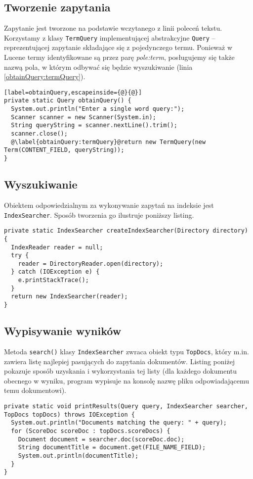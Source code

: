\subsection{Tworzenie zapytania}

Zapytanie jest tworzone na podstawie wczytanego z linii poleceń tekstu. Korzystamy z klasy \texttt{TermQuery} implementującej abstrakcyjne \texttt{Query} -- reprezentującej zapytanie składające się z pojedynczego termu. Ponieważ w Lucene termy identyfikowane są przez parę \emph{pole:term}, posługujemy się także nazwą pola, w którym odbywać się będzie wyszukiwanie (linia \ref{obtainQuery:termQuery}).

\begin{lstlisting}[label=obtainQuery,escapeinside={@}{@}]
private static Query obtainQuery() {
  System.out.println("Enter a single word query:");
  Scanner scanner = new Scanner(System.in);
  String queryString = scanner.nextLine().trim();
  scanner.close();
  @\label{obtainQuery:termQuery}@return new TermQuery(new Term(CONTENT_FIELD, queryString));
}
\end{lstlisting}

\subsection{Wyszukiwanie}

Obiektem odpowiedzialnym za wykonywanie zapytań na indeksie jest \texttt{IndexSearcher}. Sposób tworzenia go ilustruje poniższy listing.

\begin{lstlisting}
private static IndexSearcher createIndexSearcher(Directory directory) {
  IndexReader reader = null;
  try {
    reader = DirectoryReader.open(directory);
  } catch (IOException e) {
    e.printStackTrace();
  }
  return new IndexSearcher(reader);
}
\end{lstlisting}

\subsection{Wypisywanie wyników}

Metoda \texttt{search()} klasy \texttt{IndexSearcher} zwraca obiekt typu \texttt{TopDocs}, który m.in. zawiera listę najlepiej pasujących do zapytania dokumentów. Listing poniżej pokazuje sposób uzyskania i wykorzystania tej listy (dla każdego dokumentu obecnego w wyniku, program wypisuje na konsolę nazwę pliku odpowiadającemu temu dokumentowi).

\begin{lstlisting}
private static void printResults(Query query, IndexSearcher searcher, TopDocs topDocs) throws IOException {
  System.out.println("Documents matching the query: " + query);
  for (ScoreDoc scoreDoc : topDocs.scoreDocs) {
    Document document = searcher.doc(scoreDoc.doc);
    String documentTitle = document.get(FILE_NAME_FIELD);
    System.out.println(documentTitle);
  }
}
\end{lstlisting}
